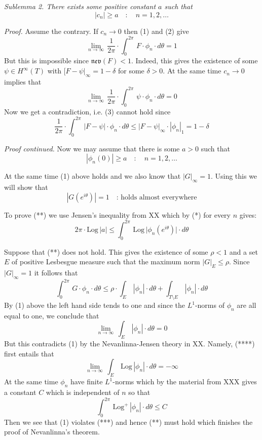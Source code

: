 \documentclass{amsart}
\begin{document}
\noindent
\emph{Sublemma 2. There exists some positive constant
$a$ such that}
\[ 
|c_n|\geq a\quad\colon\quad n=1,2,\ldots
\]


\noindent
\emph{Proof.}
Assume the contrary. If $c_n\to 0$ then (1) and (2)  give
\medskip
\[
\lim_{n\to\infty}\, \frac{1}{2\pi}\cdot\int_0^{2\pi}\,
F\cdot \phi_n\cdot d\theta=1\tag{3}
\]
But this is impossible since  $\mathfrak{nev}(F)<1$.
Indeed, this gives the existence of some
$\psi\in H^\infty(T)$ with $[F-\psi|_\infty=1-\delta$
for some $\delta>0$.
At the same time $c_n\to 0$ implies that
\[
\lim_{n\to\infty}\, \frac{1}{2\pi}\cdot\int_0^{2\pi}\,
\psi\cdot \phi_n\cdot d\theta=0
\]
Now we get a contradiction, i.e. (3) cannot hold since
\[
\frac{1}{2\pi}\cdot\int_0^{2\pi}\,
|F-\psi|\cdot \phi_n\cdot d\theta\leq |F-\psi|_\infty\cdot |\phi_n|_1=
1-\delta
\] 
\medskip

\noindent
{\emph{Proof continued.}}
Now we may assume that there is some
$a>0$ such that
\[
|\phi_n(0)|\geq a\quad\colon\quad n=1,2,\ldots\tag{*}
\]


\medskip

\noindent
At the same time (1) above holds and
we also know that
$|G|_\infty=1$.
Using  this we will show that 
\[
|G(e^{i\theta})|= 1\quad\colon\,\text{holds almost everywhere}\tag{**}
\]


\noindent
To prove (**) we use Jensen's inequality from XX
which by (*) for every $n$ gives:
\[
2\pi\cdot\text{Log}\,|a|\leq
\int_0^{2\pi}\, \text{Log}\, \bigl |\phi_n(e^{i\theta})\bigr |\cdot d\theta\tag{***}
\]


\noindent 
Suppose  that (**) does not hold. This gives
the existence of some
$\rho<1$ and a  set $E$ of 
positive Lesbesgue measure such that 
the maximum norm $|G|_E \leq \rho$.
Since $|G|_\infty=1$ it follows that
\[
\int_0^{2\pi}\,
G\cdot \phi_n\cdot d\theta
\leq \rho\cdot \int_E\,|\phi_n|\cdot d\theta
+\int_{T\setminus E}\,|\phi_n|\cdot d\theta
\]
By (1) above  the left hand side tends to one  and since
the $L^1$-norms of $\phi_n$ are all equal to one, we conclude that
\[
\lim_{n\to\infty}\,
\int_E\,|\phi_n|\cdot d\theta=0\tag{****}
\]
But this  contradicts  (1) by the Nevanlinna-Jensen theory in
XX. Namely, (****) first entails that
\[
\lim_{n\to\infty}\,
\int_E\,\text{Log}\,|\phi_n|\cdot d\theta=-\infty\tag{1}
\]
At the same time $\phi_n$ have finite $L^1$-norms
which by the material from XXX  gives a constant $C$ which is independent of
$n$ so that
\[
\int_0^{2\pi}\,\text{Log}^+\,|\phi_n|\cdot d\theta\leq C
\]
Then we see that (1) violates (***) and hence 
(**) must hold which finishes the proof of Nevanlinna's theorem.
\medskip
\end{document}
